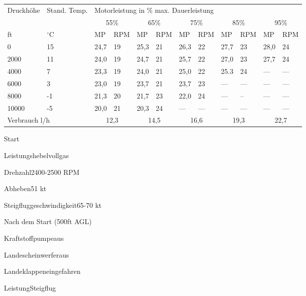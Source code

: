 \begin{table*}[t]
  \centering
  \begin{tabular}{@{}ll|ll|ll|ll|ll|ll@{}}
    \multirow{2}{*}{Druckhöhe} &
      \multirow{2}{*}{Stand. Temp.} &
      \multicolumn{10}{l}{Motorleistung in \% max. Dauerleistung} \\ \cmidrule(l){3-12} 
     &
       &
      \multicolumn{2}{c}{55\%} &
      \multicolumn{2}{c}{65\%} &
      \multicolumn{2}{c}{75\%} &
      \multicolumn{2}{c}{85\%} &
      \multicolumn{2}{c}{95\%} \\ \cmidrule(r){1-2}
    ft    & $^{\circ}$C & MP   & RPM & MP   & RPM & MP   & RPM & MP   & RPM & MP   & RPM \\
    0     & 15 & 24,7 & 19  & 25,3 & 21  & 26,3 & 22  & 27,7 & 23  & 28,0 & 24  \\\hline
    2000  & 11 & 24,0 & 19  & 24,7 & 21  & 25,7 & 22  & 27,0 & 23  & 27,7 & 24  \\\hline
    4000  & 7  & 23,3 & 19  & 24,0 & 21  & 25,0 & 22  & 25.3 & 24  & ---  & --- \\\hline
    6000  & 3  & 23,0 & 19  & 23,7 & 21  & 23,7 & 23  & ---  & --- & ---  & --- \\\hline
    8000  & -1 & 21,3 & 20  & 21,7 & 23  & 22,0 & 24  & ---  & --  & ---  & --- \\\hline
    10000 & -5 & 20,0 & 21  & 20,3 & 24  & ---  & --- & ---  & --- & ---  & --- \\\hline
    \multicolumn{2}{l}{Verbrauch l/h} &
      \multicolumn{2}{c}{12,3} &
      \multicolumn{2}{c}{14,5} &
      \multicolumn{2}{c}{16,6} &
      \multicolumn{2}{c}{19,3} &
      \multicolumn{2}{c}{22,7}
    \end{tabular}
\end{table*}

\begin{task}
  \begin{checklist}{Start}
    \item{Leistungshebel}{vollgas}
    \item{Drehzahl}{2400-2500 RPM}
    \item{Abheben}{51 kt}
    \item{Steigfluggeschwindigkeit}{65-70 kt}
  \end{checklist}
\end{task}

\begin{task}
  \begin{checklist}{Nach dem Start (500ft AGL)}
    \item{Kraftstoffpumpe}{aus}
    \item{Landescheinwerfer}{aus}
    \item{Landeklappen}{eingefahren}
    \item{Leistung}{Steigflug}
  \end{checklist}
\end{task}


